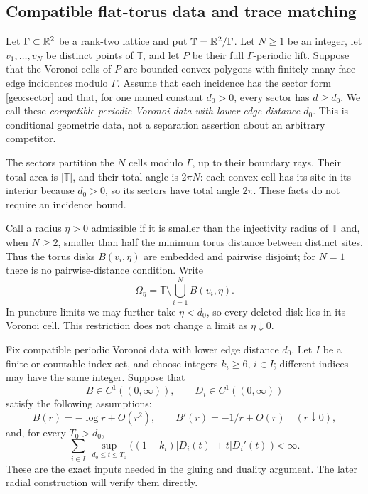 

\subsection{Compatible flat-torus data and trace matching}

Let \(\Gamma\subset\mathbb R^2\) be a rank-two lattice and put
\(\mathbb T=\mathbb R^2/\Gamma\). Let \(N\geq1\) be an integer, let
\(v_1,\ldots,v_N\) be distinct points of \(\mathbb T\), and let
\(P\) be their full \(\Gamma\)-periodic lift. Suppose that the Voronoi
cells of \(P\) are bounded convex polygons with finitely many
face--edge incidences modulo \(\Gamma\). Assume that each incidence
has the sector form \eqref{geo:sector} and that, for one named constant
\(d_0>0\), every sector has \(d\geq d_0\). We call these
\emph{compatible periodic Voronoi data with lower edge distance \(d_0\)}.
This is conditional geometric data, not a separation assertion about
an arbitrary competitor.

The sectors partition the \(N\) cells modulo \(\Gamma\), up to their
boundary rays. Their total area is \(|\mathbb T|\), and their total
angle is \(2\pi N\): each convex cell has its site in its interior
because \(d_0>0\), so its sectors have total angle \(2\pi\).
These facts do not require an incidence bound.

Call a radius \(\eta>0\) admissible if it is smaller than the
injectivity radius of \(\mathbb T\) and, when \(N\geq2\), smaller
than half the minimum torus distance between distinct sites. Thus the
torus disks \(B(v_i,\eta)\) are embedded and pairwise disjoint; for
\(N=1\) there is no pairwise-distance condition. Write
\[
 \Omega_\eta=\mathbb T\setminus\bigcup_{i=1}^N B(v_i,\eta).
\]
In puncture limits we may further take \(\eta<d_0\), so every deleted
disk lies in its Voronoi cell. This restriction does not change a limit
as \(\eta\downarrow0\).

Fix compatible periodic Voronoi data with lower edge distance \(d_0\).
Let \(I\) be a finite or countable index set,
and choose integers \(k_i\geq6\), \(i\in I\); different indices
may have the same integer.  Suppose that
\[
 B\in C^1((0,\infty)),\qquad D_i\in C^1((0,\infty))
\]
satisfy the following assumptions:
\begin{equation}
 B(r)=-\log r+O(r^2),\qquad
 B'(r)=-1/r+O(r)
                    \quad(r\downarrow0),
 \label{dual:radial-origin}
\end{equation}
and, for every \(T_0>d_0\),
\begin{equation}
 \sum_{i\in I}\ \sup_{d_0\leq t\leq T_0}
 \bigl((1+k_i)|D_i(t)|+t|D_i'(t)|\bigr)<\infty.
 \label{dual:radial-sum}
\end{equation}
These are the exact inputs needed in the gluing and duality
argument.  The later radial construction will verify them
directly.

